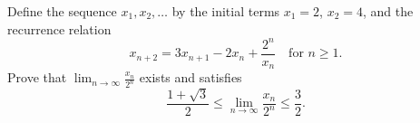 Define the sequence \(x_1, x_2, \ldots\) by the initial terms \(x_1 = 2\), \(x_2 = 4\), and the recurrence relation
\[
x_{n+2} = 3x_{n+1} - 2x_n + \frac{2^n}{x_n} \quad \text{for } n \ge 1.
\]
Prove that \(\displaystyle\lim_{n \to \infty} \frac{x_n}{2^n}\) exists and satisfies
\[
\frac{1 + \sqrt{3}}{2} \le \lim_{n \to \infty} \frac{x_n}{2^n} \le \frac{3}{2}.
\]
